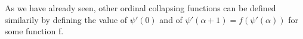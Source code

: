 \documentclass[10pt]{article}
\begin{document}
\bigskip

As we have already seen, other ordinal collapsing functions can be defined similarily by defining the value of \( \psi'(0) \) and of \( \psi'(\alpha+1) = f(\psi'(\alpha)) \) for some function f.

\bigskip

\begin{comment}
To define notations based on these functions, we also need a way to express the ordinals to which they are applied. This can be done by introducing in the notation the operations which permit to express them, like addition, multiplication, exponentiation. This can also be done by introducing, like we have seen for Madore's \( \psi \), a function \( \psi'_1 \) which generates these expressions, defined in a similar way to \( \psi' \), but starting for example with \( \psi'(0) = \Omega \).

\bigskip

Here are some example of such ordinal collapsing functions :

\bigskip


\begin{tabular}{|c|c|c|c|c|c|c|c|c|} \hline


\end{comment}
\end{document}
